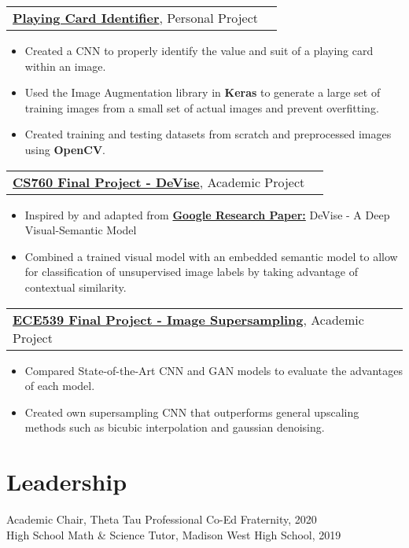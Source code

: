 \documentclass[letterpaper,11pt]{article}
\makeatletter
\newcommand{\projtitle}[2]{
  \vspace{7pt}
  \begin{tabular*}{1.00\textwidth}[t]{l@{\extracolsep{\fill}}r}
    \textbf{#1}, #2 \\
  \end{tabular*}\vspace{-5pt}
}
\newcommand{\expstart}{\begin{itemize}[leftmargin=5mm]}
\newcommand{\expend}{\end{itemize}\vspace{-5pt}}
\newcommand{\expitem}[1]{\item\small{{#1 \vspace{-5pt}}}}
\makeatother
\begin{document}
    \projtitle{\href{https://github.com/jth1011/Playing-Card-Identifier}{Playing Card Identifier}}{Personal Project}
  \expstart
    \expitem{Created a CNN to properly identify the value and suit of a playing card within an image.}
    \expitem{Used the Image Augmentation library in \textbf{Keras} to generate a large set of training images from a small set of actual images and prevent overfitting.}
    \expitem{Created training and testing datasets from scratch and preprocessed images using \textbf{OpenCV}.}
  \expend
 
  \projtitle{\href{https://github.com/jth1011}{CS760 Final Project - DeVise}}{Academic Project}
  \expstart
    \expitem{Inspired by and adapted from \href{http://www.cs.toronto.edu/~ranzato/publications/frome_nips2013.pdf}{\textbf{Google Research Paper:}}}DeVise - A Deep Visual-Semantic Model
    \expitem{Combined a trained visual model with an embedded semantic model to allow for classification of unsupervised image labels by taking advantage of contextual similarity.}
  \expend
  
  \projtitle{\href{https://github.com/jth1011}{ECE539 Final Project - Image Supersampling}}{Academic Project}
  \expstart
    \expitem{Compared State-of-the-Art CNN and GAN models to evaluate the advantages of each model.}
    \expitem{Created own supersampling CNN that outperforms general upscaling methods such as bicubic interpolation and gaussian denoising.}
  \expend

\section{Leadership}
   Academic Chair, Theta Tau Professional Co-Ed Fraternity, 2020 \\
   High School Math \& Science Tutor, Madison West High School, 2019

\end{document}
